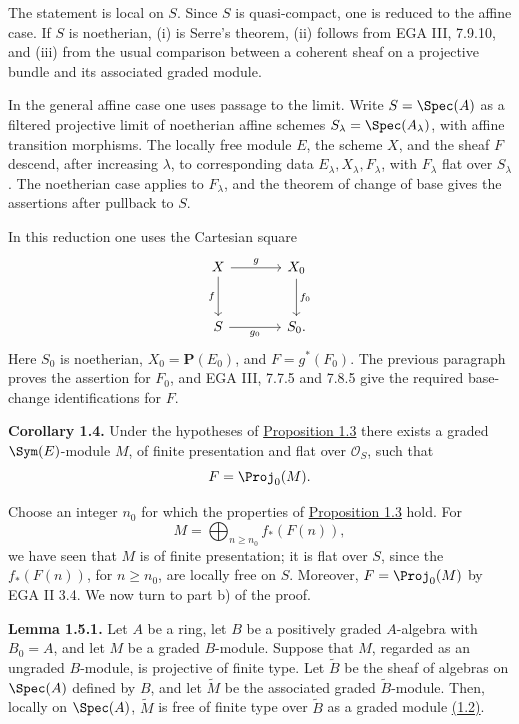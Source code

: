 The statement is local on \(S\). Since \(S\) is quasi-compact, one is reduced to the affine case. If \(S\) is noetherian, (i) is Serre's theorem, (ii) follows from EGA III, 7.9.10, and (iii) from the usual comparison between a coherent sheaf on a projective bundle and its associated graded module.

In the general affine case one uses passage to the limit. Write \(S=\Spec(A)\) as a filtered projective limit of noetherian affine schemes \(S_\lambda=\Spec(A_\lambda)\), with affine transition morphisms. The locally free module \(E\), the scheme \(X\), and the sheaf \(F\) descend, after increasing \(\lambda\), to corresponding data \(E_\lambda,X_\lambda,F_\lambda\), with \(F_\lambda\) flat over \(S_\lambda\). The noetherian case applies to \(F_\lambda\), and the theorem of change of base gives the assertions after pullback to \(S\).

In this reduction one uses the Cartesian square
\[
\begin{tikzcd}[column sep=large,row sep=large]
X \arrow[r,"g"] \arrow[d,"f"'] & X_0 \arrow[d,"f_0"]\\
S \arrow[r,"g_0"'] & S_0 .
\end{tikzcd}
\]
Here \(S_0\) is noetherian, \(X_0=\mathbf P(E_0)\), and \(F=g^*(F_0)\). The previous paragraph proves the assertion for \(F_0\), and EGA III, 7.7.5 and 7.8.5 give the required base-change identifications for \(F\).

\textbf{Corollary 1.4.} Under the hypotheses of \hyperlink{sga6.e06.prop.1-3}{Proposition 1.3} there exists a graded \(\Sym(E)\)-module \(M\), of finite presentation and flat over \(\mathcal O_S\), such that
\[
  F=\Proj_0(M).
\]

Choose an integer \(n_0\) for which the properties of \hyperlink{sga6.e06.prop.1-3}{Proposition 1.3} hold. For
\[
 M=\bigoplus_{n\ge n_0}f_*(F(n)),
\]
we have seen that \(M\) is of finite presentation; it is flat over \(S\), since the \(f_*(F(n))\), for \(n\ge n_0\), are locally free on \(S\). Moreover, \(F=\Proj_0(M)\) by EGA II 3.4. We now turn to part b) of the proof.

\textbf{Lemma 1.5.1.} Let \(A\) be a ring, let \(B\) be a positively graded \(A\)-algebra with \(B_0=A\), and let \(M\) be a graded \(B\)-module. Suppose that \(M\), regarded as an ungraded \(B\)-module, is projective of finite type. Let \(\widetilde B\) be the sheaf of algebras on \(\Spec(A)\) defined by \(B\), and let \(\widetilde M\) be the associated graded \(\widetilde B\)-module. Then, locally on \(\Spec(A)\), \(\widetilde M\) is free of finite type over \(\widetilde B\) as a graded module \hyperlink{sga6.e06.prop.1-2}{(1.2)}.

